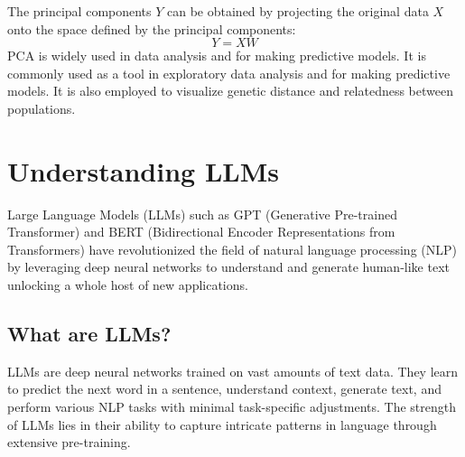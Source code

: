 The principal components $Y$ can be obtained by projecting the original data $X$ onto the space defined by the principal components:
\begin{equation}
    Y = XW
    \label{eq:principal_components}
\end{equation}
PCA is widely used in data analysis and for making predictive models. It is commonly used as a tool in exploratory data analysis and for making predictive models. It is also employed to visualize genetic distance and relatedness between populations.

\section{Understanding LLMs}
    Large Language Models (LLMs) such as GPT (Generative Pre-trained Transformer) and BERT (Bidirectional Encoder Representations from Transformers) have revolutionized the field of natural language processing (NLP) by leveraging deep neural networks to understand and generate human-like text unlocking a whole host of new applications.


    \subsection{What are LLMs?}
        LLMs are deep neural networks trained on vast amounts of text data. They learn to predict the next word in a sentence, understand context, generate text, and perform various NLP tasks with minimal task-specific adjustments. The strength of LLMs lies in their ability to capture intricate patterns in language through extensive pre-training.
       
       
